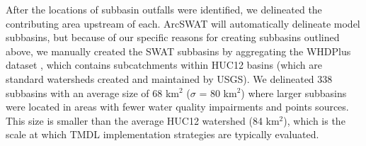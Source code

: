 After the locations of subbasin outfalls were identified, we delineated the contributing area upstream of each.
ArcSWAT will automatically delineate model subbasins, but because of our specific reasons for creating subbasins outlined above, we manually created the SWAT subbasins by aggregating the WHDPlus dataset \citep{wdnr_whdplus_2013}, which contains subcatchments within HUC12 basins (which are standard watersheds created and maintained by USGS). 
We delineated 338 subbasins with an average size of 68 km$^2$ ($\sigma$ = 80 km$^2$) where larger subbasins were located in areas with fewer water quality impairments and points sources. This size is smaller than the average HUC12 watershed (84 km$^2$), which is the scale at which TMDL implementation strategies are typically evaluated.




